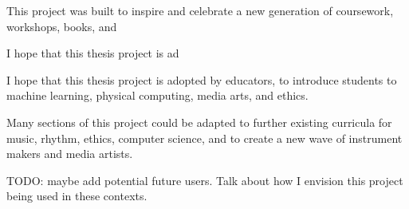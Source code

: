 This project was built to inspire and celebrate a new generation of coursework, workshops, books, and 

I hope that this thesis project is ad

I hope that this thesis project is adopted by educators, to introduce students to machine learning, physical computing, media arts, and ethics.

Many sections of this project could be adapted to further existing curricula for music, rhythm, ethics, computer science, and to create a new wave of instrument makers and media artists.

TODO: maybe add potential future users. Talk about how I envision this project being used in these contexts.
